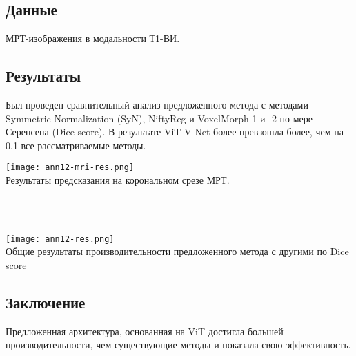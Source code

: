 \subsection*{Данные}
МРТ-изображения в модальности Т1-ВИ.
\subsection*{Результаты}
Был проведен сравнительный анализ предложенного метода с методами Symmetric 
Normalization (SyN), NiftyReg и VoxelMorph-1 и -2 по мере Серенсена (Dice score).
В результате ViT-V-Net более превзошла более, чем на 0.1 все рассматриваемые методы.
\\
\begin{minipage}{1.0\linewidth}
    \begin{center}
        \texttt{[image: ann12-mri-res.png]} \\
        \caption{\scriptsize{Результаты предсказания на корональном срезе МРТ.}}
    \end{center}

\end{minipage}
\\
\\
\begin{minipage}{1.0\linewidth}
    \begin{center}
        \texttt{[image: ann12-res.png]} \\
        \caption{\scriptsize{Общие результаты производительности предложенного 
        метода с другими по Dice score}}
    \end{center}

\end{minipage}
\subsection*{Заключение}
Предложенная архитектура, основанная на ViT достигла большей производительности, чем 
существующие методы и показала свою эффективность.
